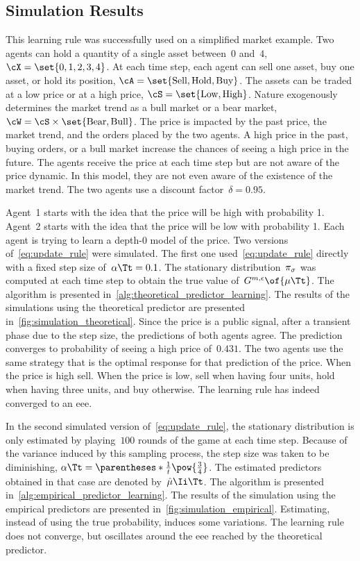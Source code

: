\subsection{Simulation Results}
This learning rule was successfully used on a simplified market example.
Two agents can hold a quantity of a single asset between~\(0\) and~\(4\), \(\cX = \set{0,1,2,3,4}\).
At each time step, each agent can sell one asset, buy one asset, or hold its position, \(\cA = \set{\text{Sell}, \text{Hold}, \text{Buy}}\).
The assets can be traded at a low price or at a high price, \(\cS=\set{\text{Low}, \text{High}}\).
Nature exogenously determines the market trend as a bull market or a bear market, \(\cW=\cS \times \set{\text{Bear}, \text{Bull}}\).
The price is impacted by the past price, the market trend, and the orders placed by the two agents.
A high price in the past, buying orders, or a bull market increase the chances of seeing a high price in the future.
The agents receive the price at each time step but are not aware of the price dynamic.
In this model, they are not even aware of the existence of the market trend.
The two agents use a discount factor~\(\delta=0.95\).

Agent~1 starts with the idea that the price will be high with probability 1.
Agent~2 starts with the idea that the price will be low with probability 1.
Each agent is trying to learn a depth-\(0\) model of the price.
Two versions of~\cref{eq:update_rule} were simulated.
The first one used~\cref{eq:update_rule} directly with a fixed step size of~\(\alpha\Tt = 0.1\).
The stationary distribution~\(\pi_{\sigma}\) was computed at each time step to obtain the true value of~\(\GGe \of{\mu\Tt}\).
The algorithm is presented in~\cref{alg:theoretical_predictor_learning}.
The results of the simulations using the theoretical predictor are presented in~\cref{fig:simulation_theoretical}.
Since the price is a public signal, after a transient phase due to the step size, the predictions of both agents agree.
The prediction converges to probability of seeing a high price of~\(0.431\).
The two agents use the same strategy that is the optimal response for that prediction of the price.
When the price is high sell.
When the price is low, sell when having four units, hold when having three units, and buy otherwise.
The learning rule has indeed converged to an \ac{eee}.

In the second simulated version of~\cref{eq:update_rule}, the stationary distribution is only estimated by playing~\(100\) rounds of the game at each time step.
Because of the variance induced by this sampling process, the step size was taken to be diminishing, \(\alpha\Tt = \parentheses*{\frac{1}{t}}\pow{\frac{3}{4}}\).
The estimated predictors obtained in that case are denoted by~\(\hat{\mu}\Ii\Tt\).
The algorithm is presented in~\cref{alg:empirical_predictor_learning}.
The results of the simulation using the empirical predictors are presented in~\cref{fig:simulation_empirical}.
Estimating, instead of using the true probability, induces some variations.
The learning rule does not converge, but oscillates around the \ac{eee} reached by the theoretical predictor.

